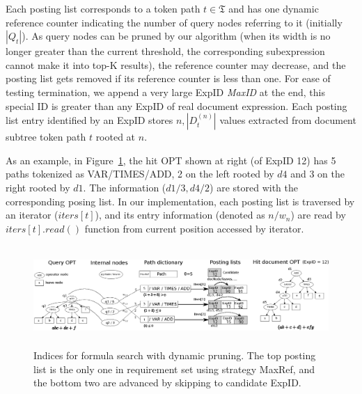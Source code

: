 \documentclass[runningheads]{llncs}
\begin{document}
Each posting list corresponds to a token path $t \in \mathfrak{T}$ and has one dynamic reference counter indicating the number of query nodes referring to it (initially $|Q_t|$).
As query nodes can be pruned by our algorithm (when its width is no longer greater than the current threshold, the corresponding subexpression cannot make it into top-K results),
the reference counter may decrease, and the posting list gets removed if its reference counter is less than one.
For ease of testing termination, we append a very large ExpID \emph{MaxID} at the end, this special ID is greater than any ExpID of real document expression.
%
Each posting list entry identified by an ExpID stores $n, |D^{(n)}_t|$ values extracted from document subtree token path $t$ rooted at $n$.

As an example, in Figure~\ref{figillu}, the hit OPT shown at right (of ExpID 12) has 5 paths tokenized as VAR/TIMES/ADD, 2 on the left rooted by $d4$ and 3 on the right rooted by $d1$. The information ($d1/3, d4/2$) are stored with the corresponding posing list.
In our implementation, each posting list is traversed by an iterator ($iters[t]$), and its entry information (denoted as $n/w_n$) are read by $iters[t].read()$ function from current position accessed by iterator.

\begin{figure}[!t]
\begin{center}
\hspace*{-0.6in}\includegraphics[height=1.5in]{fig/drawing.eps}
\caption{Indices for formula search with dynamic pruning. The top posting list is the only one in requirement set using strategy MaxRef, and the bottom two are advanced by skipping to candidate ExpID.}
\label{figillu}
\end{center}
\end{figure}
\end{document}
